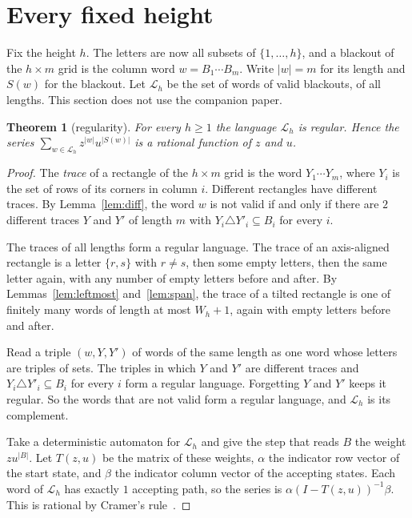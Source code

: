 \documentclass[12pt]{article}
\theoremstyle{plain}
\newtheorem{theorem}{Theorem}
\theoremstyle{definition}
\theoremstyle{remark}
\begin{document}
\section{Every fixed height}\label{sec:height}

Fix the height $h$. The letters are now all subsets of $\{1,\dots,h\}$, and a
blackout of the $h\times m$ grid is the column word $w=B_1\cdots B_m$. Write
$|w|=m$ for its length and $S(w)$ for the blackout. Let $\mathcal L_h$ be the
set of words of valid blackouts, of all lengths. This section does not use the
companion paper.

\begin{theorem}[regularity]\label{thm:regular}
For every $h\ge1$ the language $\mathcal L_h$ is regular. Hence the series
$\sum_{w\in\mathcal L_h}z^{|w|}u^{|S(w)|}$ is a rational function of $z$ and $u$.
\end{theorem}

\begin{proof}
The \emph{trace} of a rectangle of the $h\times m$ grid is the word
$Y_1\cdots Y_m$, where $Y_i$ is the set of rows of its corners in column $i$.
Different rectangles have different traces. By Lemma~\ref{lem:diff}, the word
$w$ is not valid if and only if there are $2$ different traces $Y$ and $Y'$ of
length $m$ with $Y_i\triangle Y'_i\subseteq B_i$ for every $i$.

The traces of all lengths form a regular language. The trace of an axis-aligned
rectangle is a letter $\{r,s\}$ with $r\ne s$, then some empty letters, then the
same letter again, with any number of empty letters before and after. By
Lemmas~\ref{lem:leftmost} and~\ref{lem:span}, the trace of a tilted rectangle is
one of finitely many words of length at most $W_h+1$, again with empty letters
before and after.

Read a triple $(w,Y,Y')$ of words of the same length as one word whose letters
are triples of sets. The triples in which $Y$ and $Y'$ are different traces and
$Y_i\triangle Y'_i\subseteq B_i$ for every $i$ form a regular language.
Forgetting $Y$ and $Y'$ keeps it regular. So the words that are not valid form
a regular language, and $\mathcal L_h$ is its complement.

Take a deterministic automaton for $\mathcal L_h$ and give the step that reads
$B$ the weight $zu^{|B|}$. Let $T(z,u)$ be the matrix of these weights, $\alpha$
the indicator row vector of the start state, and $\beta$ the indicator column
vector of the accepting states. Each word of $\mathcal L_h$ has exactly $1$
accepting path, so the series is $\alpha(I-T(z,u))^{-1}\beta$. This is rational
by Cramer's rule~\cite[Proposition~V.6]{flajolet2009}.
\end{proof}
\end{document}
